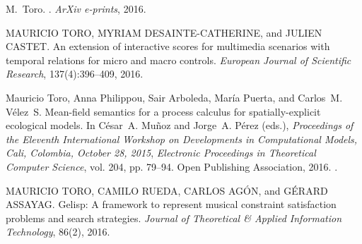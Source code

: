 \documentclass[]{lipics-iclp}
\theoremstyle{plain}\newtheorem{mainthm}[thm]{Main Theorem}
\theoremstyle{definition}\newtheorem{crucialdef}[thm]{Crucial Definition}
\begin{document}
\begin{thebibliography}{{Tor}16a}
M.~{Toro}.
.
\newblock \emph{ArXiv e-prints}, 2016.

MAURICIO TORO, MYRIAM DESAINTE-CATHERINE, and JULIEN CASTET.
\newblock An extension of interactive scores for multimedia scenarios with
  temporal relations for micro and macro controls.
\newblock \emph{European Journal of Scientific Research}, 137(4):396--409,
  2016.

Mauricio Toro, Anna Philippou, Sair Arboleda, Mar\'ia Puerta, and Carlos~M.
  V\'elez~S.
\newblock Mean-field semantics for a process calculus for spatially-explicit
  ecological models.
\newblock In C\'esar~A. Mu\~noz and Jorge~A. P\'erez (eds.), \emph{{\rm
  Proceedings of the Eleventh International Workshop on} Developments in
  Computational Models, {\rm Cali, Colombia, October 28, 2015}},
  \emph{Electronic Proceedings in Theoretical Computer Science}, vol. 204, pp.
  79--94. Open Publishing Association, 2016.
\newblock {}.

MAURICIO TORO, CAMILO RUEDA, CARLOS AG{\'O}N, and G{\'E}RARD ASSAYAG.
\newblock Gelisp: A framework to represent musical constraint satisfaction
  problems and search strategies.
\newblock \emph{Journal of Theoretical \& Applied Information Technology},
  86(2), 2016.

\end{thebibliography}
\end{document}
